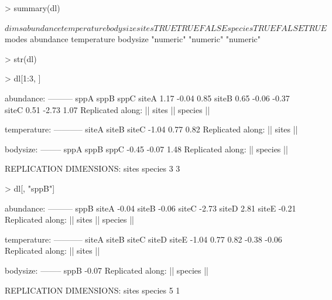 \documentclass{article}
\numberwithin{exercise}{section}
\begin{document}
\newpage

\begin{Schunk}
\begin{Sinput}
> summary(dl)
\end{Sinput}
\begin{Soutput}
$dims
        abundance temperature bodysize
sites        TRUE        TRUE    FALSE
species      TRUE       FALSE     TRUE

$modes
  abundance temperature    bodysize 
  "numeric"   "numeric"   "numeric" 
\end{Soutput}
\end{Schunk}

\newpage

\begin{Schunk}
\begin{Sinput}
> str(dl)
\end{Sinput}
\end{Schunk}

\newpage

\begin{Schunk}
\begin{Sinput}
> dl[1:3, ]
\end{Sinput}
\begin{Soutput}
abundance:
---------
      sppA  sppB  sppC
siteA 1.17 -0.04  0.85
siteB 0.65 -0.06 -0.37
siteC 0.51 -2.73  1.07
Replicated along:  || sites || species || 


temperature:
-----------
siteA siteB siteC 
-1.04  0.77  0.82 
Replicated along:  || sites || 


bodysize:
--------
 sppA  sppB  sppC 
-0.45 -0.07  1.48 
Replicated along:  || species || 


REPLICATION DIMENSIONS: 
  sites species 
      3       3 
\end{Soutput}
\end{Schunk}

\newpage

\begin{Schunk}
\begin{Sinput}
> dl[, "sppB"]
\end{Sinput}
\begin{Soutput}
abundance:
---------
       sppB
siteA -0.04
siteB -0.06
siteC -2.73
siteD  2.81
siteE -0.21
Replicated along:  || sites || species || 


temperature:
-----------
siteA siteB siteC siteD siteE 
-1.04  0.77  0.82 -0.38 -0.06 
Replicated along:  || sites || 


bodysize:
--------
 sppB 
-0.07 
Replicated along:  || species || 


REPLICATION DIMENSIONS: 
  sites species 
      5       1 
\end{Soutput}
\end{Schunk}
\end{document}
